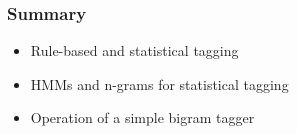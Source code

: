 \begin{frame}[fragile]\frametitle{Summary}
  \begin{itemize}
  \item Rule-based and statistical tagging
  \item HMMs and n-grams for statistical tagging
  \item Operation of a simple bigram tagger
  \end{itemize}
\end{frame}
